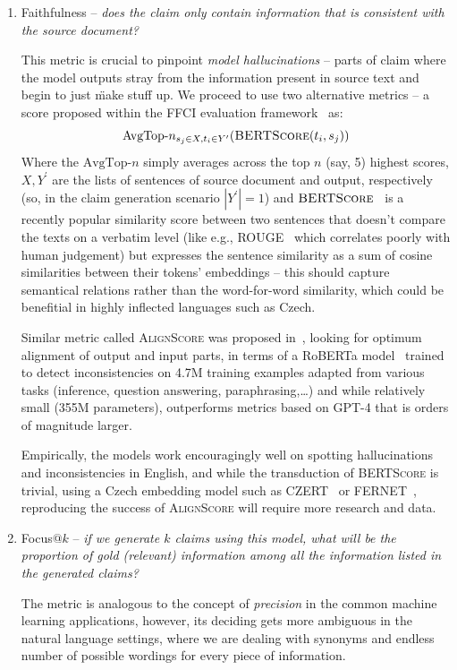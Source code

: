 \begin{enumerate}
    \item {\techbf Faithfulness} -- \textit{does the claim only contain information that is consistent with the source document?}
    
    This metric is crucial to pinpoint \textit{model hallucinations} -- parts of claim where the model outputs stray from the information present in source text and begin to just \"{make stuff up}. We proceed to use two alternative metrics -- a score proposed within the FFCI evaluation framework~\cite{ffci} as: 
    $$\text{AvgTop-}n_{s_j\in X, t_i\in Y^\prime}(\textsc{BERTScore}(t_i,s_j))$$
    Where the $\text{AvgTop-}n$ simply averages across the top $n$ (say, 5) highest scores, $X,Y^\prime$ are the lists of sentences of source document and output, respectively (so, in the claim generation scenario $|Y^\prime|=1$) and $\textsc{BERTScore}$~\cite{bert-score} is a recently popular similarity score between two sentences that doesn't compare the texts on a verbatim level (like e.g., ROUGE~\cite{lin-2004-rouge} which correlates poorly with human judgement) but expresses the sentence similarity as a sum of cosine similarities between their tokens' embeddings -- this should capture semantical relations rather than the word-for-word similarity, which could be benefitial in highly inflected languages such as Czech.

    Similar metric called \textsc{AlignScore} was proposed in~\cite{zha2023alignscore}, looking for optimum alignment of output and input parts, in terms of a RoBERTa model~\cite{roberta} trained to detect inconsistencies on 4.7M training examples adapted from various tasks (inference, question answering, paraphrasing,\dots) and while relatively small (355M parameters), outperforms metrics based on GPT-4 that is orders of magnitude larger. 

    Empirically, the models work encouragingly well on spotting hallucinations and inconsistencies in English, and while the transduction of \textsc{BERTScore} is trivial, using a Czech embedding model such as CZERT~\cite{czert} or FERNET~\cite{fernet}, reproducing the success of \textsc{AlignScore} will require more research and data.

    \item {\techbf Focus}$@k$ -- \textit{if we generate $k$ claims using this model, what will be the proportion of gold (relevant) information among all the information listed in the generated claims?}
    
    The metric is analogous to the concept of \textit{precision} in the common machine learning applications, however, its deciding gets more ambiguous in the natural language settings, where we are dealing with synonyms and endless number of possible wordings for every piece of information.


\end{enumerate}
